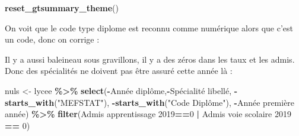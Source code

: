 \documentclass[
]{book}
\newenvironment{Shaded}{\begin{snugshade}}{\end{snugshade}}
\newcommand{\AttributeTok}[1]{\textcolor[rgb]{0.13,0.29,0.53}{#1}}
\newcommand{\DecValTok}[1]{\textcolor[rgb]{0.00,0.00,0.81}{#1}}
\newcommand{\FunctionTok}[1]{\textcolor[rgb]{0.13,0.29,0.53}{\textbf{#1}}}
\newcommand{\NormalTok}[1]{#1}
\newcommand{\OtherTok}[1]{\textcolor[rgb]{0.56,0.35,0.01}{#1}}
\newcommand{\SpecialCharTok}[1]{\textcolor[rgb]{0.81,0.36,0.00}{\textbf{#1}}}
\newcommand{\StringTok}[1]{\textcolor[rgb]{0.31,0.60,0.02}{#1}}
\begin{document}
\begin{Shaded}
\begin{Highlighting}[]
\FunctionTok{reset\_gtsummary\_theme}\NormalTok{()}
\end{Highlighting}
\end{Shaded}

On voit que le code type diplome est reconnu comme numérique alors que c'est un
code, donc on corrige :

\begin{Shaded}
\end{Shaded}

Il y a aussi baleineau sous gravillons, il y a des zéros dans les taux et les admis.
Donc des spécialités ne doivent pas être assuré cette année là :

\begin{Shaded}
\begin{Highlighting}[]
\NormalTok{nuls }\OtherTok{\textless{}{-}}\NormalTok{ lycee }\SpecialCharTok{\%\textgreater{}\%} \FunctionTok{select}\NormalTok{(}\SpecialCharTok{{-}}\StringTok{\textasciigrave{}}\AttributeTok{Année diplôme}\StringTok{\textasciigrave{}}\NormalTok{,}\SpecialCharTok{{-}}\StringTok{\textasciigrave{}}\AttributeTok{Spécialité libellé}\StringTok{\textasciigrave{}}\NormalTok{,}
                 \SpecialCharTok{{-}}\FunctionTok{starts\_with}\NormalTok{(}\StringTok{"MEFSTAT"}\NormalTok{),}
                 \SpecialCharTok{{-}}\FunctionTok{starts\_with}\NormalTok{(}\StringTok{"Code Diplôme"}\NormalTok{),}
                 \SpecialCharTok{{-}}\StringTok{\textasciigrave{}}\AttributeTok{Année première année}\StringTok{\textasciigrave{}}\NormalTok{) }\SpecialCharTok{\%\textgreater{}\%} 
  \FunctionTok{filter}\NormalTok{(}\StringTok{\textasciigrave{}}\AttributeTok{Admis apprentissage 2019}\StringTok{\textasciigrave{}}\SpecialCharTok{==}\DecValTok{0} \SpecialCharTok{|} \StringTok{\textasciigrave{}}\AttributeTok{Admis voie scolaire 2019}\StringTok{\textasciigrave{}} \SpecialCharTok{==} \DecValTok{0}\NormalTok{)}
\end{Highlighting}
\end{Shaded}
\end{document}
